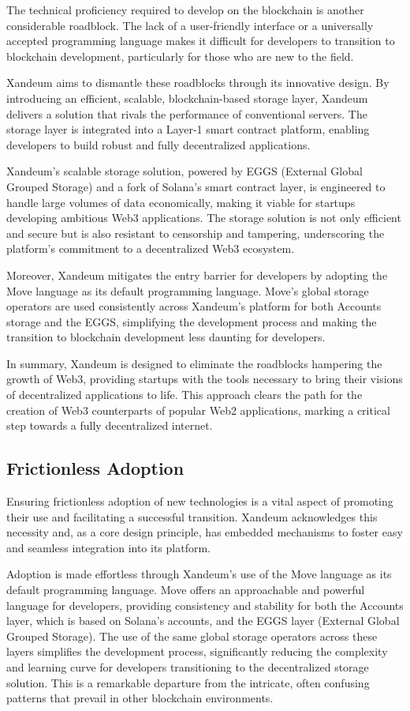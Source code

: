 \documentclass[11pt]{article}   	%
\begin{document}
The technical proficiency required to develop on the blockchain is another considerable roadblock. The lack of a user-friendly interface or a universally accepted programming language makes it difficult for developers to transition to blockchain development, particularly for those who are new to the field.

Xandeum aims to dismantle these roadblocks through its innovative design. By introducing an efficient, scalable, blockchain-based storage layer, Xandeum delivers a solution that rivals the performance of conventional servers. The storage layer is integrated into a Layer-1 smart contract platform, enabling developers to build robust and fully decentralized applications.

Xandeum's scalable storage solution, powered by EGGS (External Global Grouped Storage) and a fork of Solana's smart contract layer, is engineered to handle large volumes of data economically, making it viable for startups developing ambitious Web3 applications. The storage solution is not only efficient and secure but is also resistant to censorship and tampering, underscoring the platform's commitment to a decentralized Web3 ecosystem.

Moreover, Xandeum mitigates the entry barrier for developers by adopting the Move language as its default programming language. Move's global storage operators are used consistently across Xandeum's platform for both Accounts storage and the EGGS, simplifying the development process and making the transition to blockchain development less daunting for developers.

In summary, Xandeum is designed to eliminate the roadblocks hampering the growth of Web3, providing startups with the tools necessary to bring their visions of decentralized applications to life. This approach clears the path for the creation of Web3 counterparts of popular Web2 applications, marking a critical step towards a fully decentralized internet.

\subsection{Frictionless Adoption}
Ensuring frictionless adoption of new technologies is a vital aspect of promoting their use and facilitating a successful transition. Xandeum acknowledges this necessity and, as a core design principle, has embedded mechanisms to foster easy and seamless integration into its platform.

Adoption is made effortless through Xandeum's use of the Move language as its default programming language. Move offers an approachable and powerful language for developers, providing consistency and stability for both the Accounts layer, which is based on Solana's accounts, and the EGGS layer (External Global Grouped Storage). The use of the same global storage operators across these layers simplifies the development process, significantly reducing the complexity and learning curve for developers transitioning to the decentralized storage solution. This is a remarkable departure from the intricate, often confusing patterns that prevail in other blockchain environments.
\end{document}
